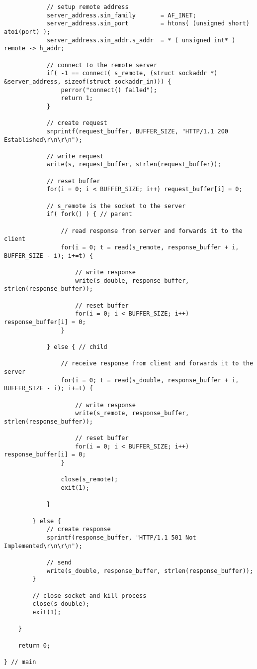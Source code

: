 \begin{lstlisting}
            // setup remote address
            server_address.sin_family       = AF_INET;
            server_address.sin_port         = htons( (unsigned short) atoi(port) );
            server_address.sin_addr.s_addr  = * ( unsigned int* ) remote -> h_addr;

            // connect to the remote server
            if( -1 == connect( s_remote, (struct sockaddr *) &server_address, sizeof(struct sockaddr_in))) {
                perror("connect() failed");
                return 1;
            }

            // create request
            snprintf(request_buffer, BUFFER_SIZE, "HTTP/1.1 200 Established\r\n\r\n");

            // write request
            write(s, request_buffer, strlen(request_buffer));

            // reset buffer
            for(i = 0; i < BUFFER_SIZE; i++) request_buffer[i] = 0;

            // s_remote is the socket to the server
            if( fork() ) { // parent

                // read response from server and forwards it to the client
                for(i = 0; t = read(s_remote, response_buffer + i, BUFFER_SIZE - i); i+=t) {
                    
                    // write response
                    write(s_double, response_buffer, strlen(response_buffer));

                    // reset buffer
                    for(i = 0; i < BUFFER_SIZE; i++) response_buffer[i] = 0;
                }

            } else { // child

                // receive response from client and forwards it to the server
                for(i = 0; t = read(s_double, response_buffer + i, BUFFER_SIZE - i); i+=t) {
                    
                    // write response
                    write(s_remote, response_buffer, strlen(response_buffer));

                    // reset buffer
                    for(i = 0; i < BUFFER_SIZE; i++) response_buffer[i] = 0;
                }

                close(s_remote);
                exit(1);

            }

        } else {
            // create response
            sprintf(response_buffer, "HTTP/1.1 501 Not Implemented\r\n\r\n");

            // send
            write(s_double, response_buffer, strlen(response_buffer));
        }

        // close socket and kill process
        close(s_double);
        exit(1);

    }

    return 0;

} // main
\end{lstlisting}